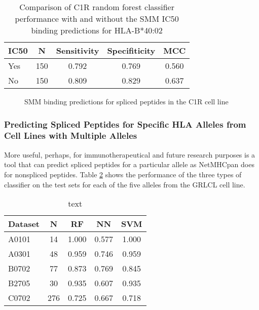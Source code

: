 \documentclass[10pt,a4paper,twoside,twocolumn]{article}
\begin{document}
\begin{table}
	\centering
	\begin{tabular}{lcccc}
		\toprule
		IC50 & N & Sensitivity & Specifiticity & MCC \\ 
		\midrule
		Yes & 150 & 0.792 & 0.769 & 0.560 \\
		No & 150 & 0.809 & 0.829 & 0.637 \\
		\bottomrule
	\end{tabular}
	\caption{Comparison of C1R random forest classifier performance with and without the SMM IC50 binding predictions for HLA-B*40:02}
	\label{C1R-predictions}
\end{table}

\begin{figure}
	\setlength\figureheight{4cm}
	\setlength{}
	
	\caption{SMM binding predictions for spliced peptides in the C1R cell line}
	\label{C1R-binding-predictions}
\end{figure}


\subsubsection*{Predicting Spliced Peptides for Specific HLA Alleles from Cell Lines with Multiple Alleles}

More useful, perhaps, for immunotherapeutical and future research purposes is a tool that can predict spliced peptides for a particular allele as NetMHCpan does for nonspliced peptides. Table \ref{allele-results} shows the performance of the three types of classifier on the test sets for each of the five alleles from the GRLCL cell line.
\begin{table}
	\centering
\begin{tabular}{lcccc}
	\toprule
	Dataset &    N &     RF &     NN &    SVM \\
	\midrule
	A0101 &   14 &  1.000 &  0.577 &  1.000 \\
	A0301 &   48 &  0.959 &  0.746 &  0.959 \\
	B0702 &   77 &  0.873 &  0.769 &  0.845 \\
	B2705 &   30 &  0.935 &  0.607 &  0.935 \\
	C0702 &  276 &  0.725 &  0.667 &  0.718 \\
	\bottomrule
\end{tabular}
\caption{text}
\label{allele-results}
\end{table}
\end{document}
